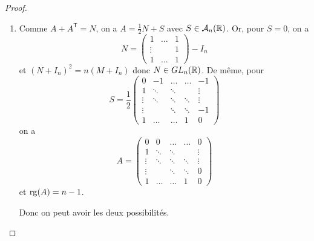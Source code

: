 \begin{proof}
\begin{enumerate}
        \item Comme $A+A^{\mathsf{T}}=N$, on a $A=\frac{1}{2}N+S$ avec $S\in\mathcal{A}_{n}(\mathbb{R})$. Or, pour $S=0$, on a 
        \begin{equation}
            N=\begin{pmatrix}
                1&\dots&1\\
                \vdots & &1\\
                1 & \dots &1
            \end{pmatrix}
            -I_{n}
        \end{equation}
        et $(N+I_{n})^{2}=n(M+I_{n})$ donc $N\in GL_{n}(\mathbb{R})$. De même, pour 
        \begin{equation}
            S=\frac{1}{2}
            \begin{pmatrix}
                0&-1 &\dots & \dots& -1\\
                1 & \ddots & \ddots & & \vdots\\
                \vdots & \ddots & \ddots & \ddots & \vdots\\
                \vdots & & \ddots & \ddots & -1\\
                1 &\dots & \dots & 1 & 0
            \end{pmatrix}
        \end{equation}
        on a
        \begin{equation}
            A=
            \begin{pmatrix}
                0&0 &\dots & \dots& 0\\
                1 & \ddots & \ddots & & \vdots\\
                \vdots & \ddots & \ddots & \ddots & \vdots\\
                \vdots & & \ddots & \ddots & 0\\
                1 &\dots & \dots & 1 & 0
            \end{pmatrix}
        \end{equation}
        et $\operatorname{rg}(A)=n-1$.

        Donc on peut avoir les deux possibilités.
    \end{enumerate}
\end{proof}

